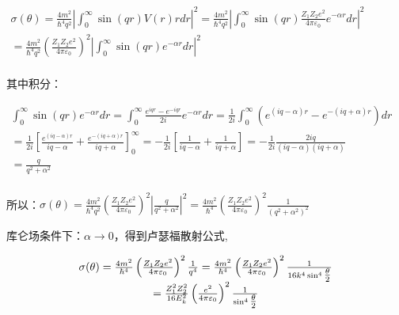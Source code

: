 $\begin{array}{l}
 \sigma (\theta ) = \frac{{4m^2 }}{{\hbar ^4 q^2 }}\left| {\int_0^\infty  {\sin (qr)V(r)rdr} } \right|^2  = \frac{{4m^2 }}{{\hbar ^4 q^2 }}\left| {\int_0^\infty  {\sin (qr)\frac{{Z_1 Z_2 e^2 }}{{4\pi \varepsilon _0 }}e^{ - \alpha r} dr} } \right|^2  \\
  = \frac{{4m^2 }}{{\hbar ^4 q^2 }}\left( {\frac{{Z_1 Z_2 e^2 }}{{4\pi \varepsilon _0 }}} \right)^2 \left| {\int_0^\infty  {\sin (qr)e^{ - \alpha r} dr} } \right|^2  \\
 \end{array}$


其中积分：

$\begin{array}{l}
 \int_0^\infty  {\sin (qr)e^{ - \alpha r} dr}  = \int_0^\infty  {\frac{{e^{iqr}  - e^{ - iqr} }}{{2i}}} e^{ - \alpha r} dr = \frac{1}{{2i}}\int_0^\infty  {\left( {e^{(iq - \alpha )r}  - e^{ - (iq + \alpha )r} } \right)} dr \\
  = \frac{1}{{2i}}\left[ {\frac{{e^{(iq - \alpha )r} }}{{iq - \alpha }} + \frac{{e^{ - (iq + \alpha )r} }}{{iq + \alpha }}} \right]_0^\infty   =  - \frac{1}{{2i}}\left[ {\frac{1}{{iq - \alpha }} + \frac{1}{{iq + \alpha }}} \right] =  - \frac{1}{{2i}}\frac{{2iq}}{{\left( {iq - \alpha } \right)\left( {iq + \alpha } \right)}} \\
  = \frac{q}{{q^2  + \alpha ^2 }} \\
 \end{array}$

所以：$\sigma (\theta ) = \frac{{4m^2 }}{{\hbar ^4 q^2 }}\left( {\frac{{Z_1 Z_2 e^2 }}{{4\pi \varepsilon _0 }}} \right)^2 \left| {\frac{q}{{q^2  + \alpha ^2 }}} \right|^2  = \frac{{4m^2 }}{{\hbar ^4 }}\left( {\frac{{Z_1 Z_2 e^2 }}{{4\pi \varepsilon _0 }}} \right)^2 \frac{1}{{\left( {q^2  + \alpha ^2 } \right)^2 }}$


库仑场条件下：$\alpha  \to 0$，得到卢瑟福散射公式,


\begin{equation}\label{27-8}
\begin{array}{c}
\sigma (\theta ) = \frac{{4m^2 }}{{\hbar ^4 }}\left( {\frac{{Z_1 Z_2
e^2 }}{{4\pi \varepsilon _0 }}} \right)^2 \frac{1}{{q^4 }} =
\frac{{4m^2 }}{{\hbar ^4 }}\left( {\frac{{Z_1 Z_2 e^2 }}{{4\pi
\varepsilon _0 }}} \right)^2 \frac{1}{{16k^4 \sin ^4
{\textstyle{\theta  \over 2}}}} \\
 = \frac{{Z_1 ^2 Z_2 ^2 }}{{16E_k ^2
}}\left( {\frac{{e^2 }}{{4\pi \varepsilon _0 }}} \right)^2
\frac{1}{{\sin ^4 {\textstyle{\theta  \over 2}}}} \\
\end{array}
\end{equation}


